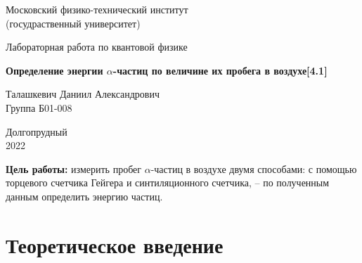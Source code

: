 \documentclass[a4paper, 12pt]{article}%
\begin{document}


\begin{titlepage}

	\newpage
	\begin{center}
		\normalsize Московский физико-технический институт \\(госудраственный 			университет)
	\end{center}

	\vspace{6em}

	\begin{center}
		\Large Лабораторная работа по квантовой физике\\
	\end{center}

	\vspace{1em}

	\begin{center}
		\large \textbf{Определение энергии $\alpha$-частиц по величине их пробега в
воздухе[4.1]}
	\end{center}

	\vspace{2em}

	\begin{center}
		\large Талашкевич Даниил Александрович\\
		Группа Б01-008
	\end{center}

	\vspace{\fill}

	\begin{center}
	Долгопрудный \\2022
	\end{center}
	
\end{titlepage}



	\thispagestyle{empty}
	\newpage
	\tableofcontents
	\newpage
	\setcounter{page}{1}



\textbf{Цель работы:} измерить пробег $\alpha$-частиц в воздухе двумя способами: с помощью торцевого счетчика Гейгера и синтиляционного счетчика, -- по полученным данным определить энергию частиц.
                    
\section{Теоретическое введение}
\end{document}
